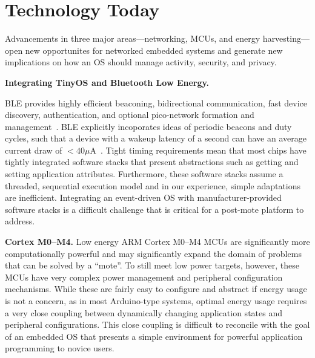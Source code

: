 \section{Technology Today}
Advancements in three major areas---networking, MCUs, and energy
harvesting---open new opportunites for networked embedded systems and generate
new implications on how an OS should manage activity, security, and privacy.


\smallskip\noindent
\textbf{Integrating TinyOS and Bluetooth Low Energy.}

BLE provides highly efficient beaconing,
bidirectional communication, fast device discovery, authentication, and
optional pico-network formation and management~\cite{ble-overview}.
BLE explicitly incoporates ideas of periodic beacons and duty cycles,
such that a device with a wakeup latency of a second can have
an average current draw of $< 40 \mu$A~\cite{nrf8001}.
%
Tight timing requirements mean that most chips have tightly
integrated software stacks that present abstractions such as
getting and setting application attributes. Furthermore, these software stacks
assume a threaded, sequential execution model and in our experience,
simple adaptations are inefficient. Integrating an
event-driven OS with manufacturer-provided software stacks is a difficult 
challenge that is critical for a post-mote platform to address.


\smallskip\noindent
\textbf{Cortex M0--M4.}
Low energy ARM Cortex M0--M4 MCUs are significantly more computationally
powerful and may significantly expand the domain of problems that can be
solved by a ``mote''.
%
To still meet low power targets, however, these MCUs have very complex power
management and peripheral configuration mechanisms. While these are fairly
easy to configure and abstract if energy usage is not a concern, as in most
Arduino-type systems, optimal energy usage requires a very close coupling
between dynamically changing application states and peripheral configurations.
This close coupling is difficult to reconcile with the goal of an embedded
OS that presents a simple environment for powerful application programming to
novice users.

